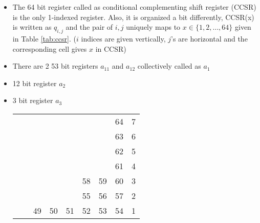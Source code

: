 \documentclass[a4paper,10pt]{article}
\begin{document}
\begin{itemize}
    \item The 64 bit register called as conditional complementing shift register (CCSR) is the only 1-indexed register. Also, it is organized a bit differently, CCSR(x) is written as $q_{i,j}$ and the pair of $i,j$ uniquely maps to $x \in \{1,2,\ldots,64\}$ given in Table \ref{tab:ccsr}. ($i$ indices are given vertically, $j$'s are horizontal and the corresponding cell gives $x$ in CCSR)
    \item There are 2 53 bit registers $a_{11}$ and $a_{12}$ collectively called as $a_{1}$
    \item 12 bit register $a_{2}$
    \item 3 bit register $a_{3}$
\begin{table}[h!]
\centering
\begin{tabular}{lllllllll}
\cline{8-8}
                               &                         &                         &                         &                         &                         & \multicolumn{1}{l|}{}   & \multicolumn{1}{l|}{64} & 7 \\ \cline{8-8}
                               &                         &                         &                         &                         &                         & \multicolumn{1}{l|}{}   & \multicolumn{1}{l|}{63} & 6 \\ \cline{8-8}
                               &                         &                         &                         &                         &                         & \multicolumn{1}{l|}{}   & \multicolumn{1}{l|}{62} & 5 \\ \cline{8-8}
                               &                         &                         &                         &                         &                         & \multicolumn{1}{l|}{}   & \multicolumn{1}{l|}{61} & 4 \\ \cline{6-8}
                               &                         &                         &                         & \multicolumn{1}{l|}{}   & \multicolumn{1}{l|}{58} & \multicolumn{1}{l|}{59} & \multicolumn{1}{l|}{60} & 3 \\ \cline{6-8}
                               &                         &                         &                         & \multicolumn{1}{l|}{}   & \multicolumn{1}{c|}{55} & \multicolumn{1}{l|}{56} & \multicolumn{1}{l|}{57} & 2 \\ \cline{3-8}
                               & \multicolumn{1}{l|}{}   & \multicolumn{1}{l|}{49} & \multicolumn{1}{l|}{50} & \multicolumn{1}{l|}{51} & \multicolumn{1}{l|}{52} & \multicolumn{1}{l|}{53} & \multicolumn{1}{l|}{54} & 1 \\ \cline{1-8}

\end{tabular}
\end{table}
\end{itemize}
\end{document}
